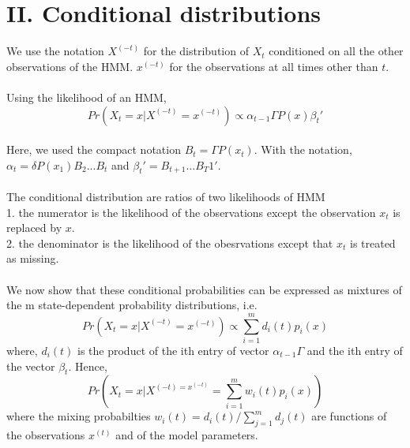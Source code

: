 \documentclass{article}
\begin{document}
\section*{II. Conditional distributions}
We use the notation $X^{(-t)}$ for the distribution of $X_t$ conditioned on all the other observations of the HMM. $x^{(-t)}$ for the observations at all times other than $t$. \\
\\
Using the likelihood of an HMM, 
$$Pr(X_t = x | X^{(-t)} = x^{(-t)}) \propto \alpha_{t-1} \Gamma P(x) \beta_t'$$
\\
Here, we used the compact notation $B_t = \Gamma P(x_t)$. With the notation, $\alpha_t = \delta P(x_1) B_2 ... B_t$ and $\beta_t' = B_{t+1}... B_T 1'$. \\
\\
The conditional distribution are ratios of two likelihoods of HMM \\
1. the numerator is the likelihood of the observations except the observation $x_t$ is replaced by $x$. \\
2. the denominator is the likelihood of the obesrvations except that $x_t$ is treated as missing. \\
\\
We now show that these conditional probabilities can be expressed as mixtures of the m state-dependent probability distributions, i.e.
$$Pr(X_t = x | X^{(-t)} = x^{(-t)}) \propto \sum_{i=1}^m d_i(t) p_i(x)$$ 
where, $d_i(t)$ is the product of the ith entry of vector $\alpha_{t-1} \Gamma$ and the ith entry of the vector $\beta_t$. Hence, 
$$Pr(X_t = x | X^{(-t) = x^{(-t)}} = \sum_{i=1}^m w_i(t) p_i(x))$$
where the mixing probabilties $w_i(t) = d_i(t) / \sum_{j=1}^m d_j(t)$ are functions of the observations $x^{(t)}$ and of the model parameters. 
\end{document}
